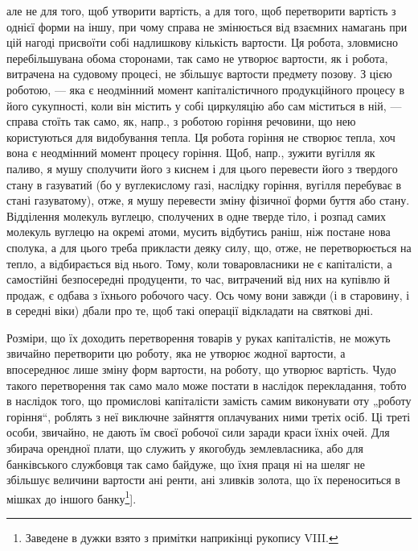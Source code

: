 \parcont{}  %
але не для того, щоб утворити вартість, а для того, щоб перетворити
вартість з однієї форми на іншу, при чому справа не змінюється від
взаємних намагань при цій нагоді присвоїти собі надлишкову кількість
вартости. Ця робота, зловмисно перебільшувана обома сторонами, так само не
утворює вартости, як і робота, витрачена на судовому процесі, не
збільшує вартости предмету позову. З цією роботою, — яка є неодмінний
момент капіталістичного продукційного процесу в його сукупності, коли
він містить у собі циркуляцію або сам міститься в ній, — справа стоїть
так само, як, напр., з роботою горіння речовини, що нею користуються для
видобування тепла. Ця робота горіння не створює тепла, хоч вона є
неодмінний момент процесу горіння. Щоб, напр., зужити вугілля як
паливо, я мушу сполучити його з киснем і для цього перевести його з
твердого стану в газуватий (бо у вуглекислому газі, наслідку горіння,
вугілля перебуває в стані газуватому), отже, я мушу перевести зміну
фізичної форми буття або стану. Відділення молекуль вуглецю, сполучених
в одне тверде тіло, і розпад самих молекуль вуглецю на окремі атоми,
мусить відбутись раніш, ніж постане нова сполука, а для цього треба
прикласти деяку силу, що, отже, не перетворюється на тепло, а
відбирається від нього. Тому, коли товаровласники не є капіталісти, а
самостійні безпосередні продуценти, то час, витрачений від них на купівлю
й продаж, є одбава з їхнього робочого часу. Ось чому вони завжди
(і в старовину, і в середні віки) дбали про те, щоб такі операції відкладати
на святкові дні.

Розміри, що їх доходить перетворення товарів у руках капіталістів, не
можуть звичайно перетворити цю роботу, яка не утворює жодної вартости,
а впосереднює лише зміну форм вартости, на роботу, що утворює вартість.
Чудо такого перетворення так само мало може постати в наслідок
перекладання, тобто в наслідок того, що промислові капіталісти замість
самим виконувати оту „роботу горіння“, роблять з неї виключне зайняття
оплачуваних ними третіх осіб. Ці треті особи, звичайно, не дають їм
своєї робочої сили заради краси їхніх очей. Для збирача орендної плати,
що служить у якогобудь землевласника, або для банківського службовця
так само байдуже, що їхня праця ні на шеляг не збільшує величини
вартости ані ренти, ані зливків золота, що їх переноситься в мішках до
іншого банку\footnote{
Заведене в дужки взято з примітки наприкінці рукопису VIII.
}].
\label{original-86}

